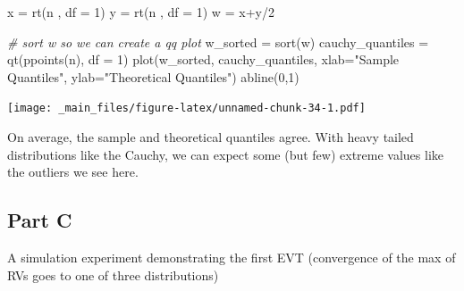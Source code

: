 \documentclass[
  oneside]{book}
\newenvironment{Shaded}{\begin{snugshade}}{\end{snugshade}}
\newcommand{\AttributeTok}[1]{\textcolor[rgb]{0.77,0.63,0.00}{#1}}
\newcommand{\CommentTok}[1]{\textcolor[rgb]{0.56,0.35,0.01}{\textit{#1}}}
\newcommand{\DecValTok}[1]{\textcolor[rgb]{0.00,0.00,0.81}{#1}}
\newcommand{\FunctionTok}[1]{\textcolor[rgb]{0.00,0.00,0.00}{#1}}
\newcommand{\NormalTok}[1]{#1}
\newcommand{\OtherTok}[1]{\textcolor[rgb]{0.56,0.35,0.01}{#1}}
\newcommand{\SpecialCharTok}[1]{\textcolor[rgb]{0.00,0.00,0.00}{#1}}
\newcommand{\StringTok}[1]{\textcolor[rgb]{0.31,0.60,0.02}{#1}}
\begin{document}
\begin{Shaded}
\begin{Highlighting}[]
\NormalTok{x }\OtherTok{=} \FunctionTok{rt}\NormalTok{(n , }\AttributeTok{df =} \DecValTok{1}\NormalTok{)}
\NormalTok{y }\OtherTok{=} \FunctionTok{rt}\NormalTok{(n , }\AttributeTok{df =} \DecValTok{1}\NormalTok{)}
\NormalTok{w }\OtherTok{=}\NormalTok{ x}\SpecialCharTok{+}\NormalTok{y}\SpecialCharTok{/}\DecValTok{2}

\CommentTok{\# sort w so we can create a qq plot}
\NormalTok{w\_sorted }\OtherTok{=} \FunctionTok{sort}\NormalTok{(w)}
\NormalTok{cauchy\_quantiles }\OtherTok{=} \FunctionTok{qt}\NormalTok{(}\FunctionTok{ppoints}\NormalTok{(n), }\AttributeTok{df =} \DecValTok{1}\NormalTok{)}
\FunctionTok{plot}\NormalTok{(w\_sorted, cauchy\_quantiles, }\AttributeTok{xlab=}\StringTok{"Sample Quantiles"}\NormalTok{, }\AttributeTok{ylab=}\StringTok{"Theoretical Quantiles"}\NormalTok{)}
\FunctionTok{abline}\NormalTok{(}\DecValTok{0}\NormalTok{,}\DecValTok{1}\NormalTok{) }
\end{Highlighting}
\end{Shaded}

\texttt{[image: \_main\_files/figure-latex/unnamed-chunk-34-1.pdf]}

On average, the sample and theoretical quantiles agree. With heavy tailed distributions like the Cauchy, we can expect some (but few) extreme values like the outliers we see here.

\hypertarget{part-c-2}{%
\subsection{Part C}\label{part-c-2}}

A simulation experiment demonstrating the first EVT (convergence of the max of RVs goes to one of three distributions)
\end{document}
